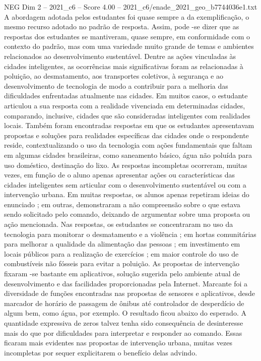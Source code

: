 \begin{textsample}{NEG Dim 2 – 2021\_c6 – Score 4.00 – 2021\_c6/enade\_2021\_geo\_b7744036e1.txt}
A abordagem adotada pelos estudantes foi quase sempre a da exemplificação, o mesmo recurso adotado no padrão de resposta.
Assim, pode -se dizer que as respostas dos estudantes se mantiveram, quase sempre, em conformidade com o contexto do padrão, mas com uma variedade muito grande de temas e ambientes relacionados ao desenvolvimento sustentável.
Dentre as ações vinculadas às cidades inteligentes, as ocorrências mais significativas foram as relacionadas à poluição, ao desmatamento, aos transportes coletivos, à segurança e ao desenvolvimento de tecnologia de modo a contribuir para a melhoria das dificuldades enfrentadas atualmente nas cidades.
Em muitos casos, o estudante articulou a sua resposta com a realidade vivenciada em determinadas cidades, comparando, inclusive, cidades que são consideradas inteligentes com realidades locais.
Também foram encontradas respostas em que os estudantes apresentavam propostas e soluções para realidades específicas das cidades onde o respondente reside, contextualizando o uso da tecnologia com ações fundamentais que faltam em algumas cidades brasileiras, como saneamento básico, água não poluída para uso doméstico, destinação do lixo.
As respostas incompletas ocorreram, muitas vezes, em função de o aluno apenas apresentar ações ou características das cidades inteligentes sem articular com o desenvolvimento sustentável ou com a intervenção urbana.
Em muitas respostas, os alunos apenas repetiram ideias do enunciado ; em outras, demonstraram a não compreensão sobre o que estava sendo solicitado pelo comando, deixando de argumentar sobre uma proposta ou ação mencionada.
Nas respostas, os estudantes se concentraram no uso da tecnologia para monitorar o desmatamento e a violência ; em hortas comunitárias para melhorar a qualidade da alimentação das pessoas ; em investimento em locais públicos para a realização de exercícios ; em maior controle do uso de combustíveis não fósseis para evitar a poluição.
As propostas de intervenção fixaram -se bastante em aplicativos, solução sugerida pelo ambiente atual de desenvolvimento e das facilidades proporcionadas pela Internet.
Marcante foi a diversidade de funções encontradas nas propostas de sensores e aplicativos, desde marcador de horário de passagem de ônibus até controlador de desperdício de algum bem, como água, por exemplo.
O resultado ficou abaixo do esperado.
A quantidade expressiva de zeros talvez tenha sido consequência de desinteresse mais do que por dificuldades para interpretar e responder ao comando.
Essas ficaram mais evidentes nas propostas de intervenção urbana, muitas vezes incompletas por sequer explicitarem o benefício delas advindo.

\end{textsample}
